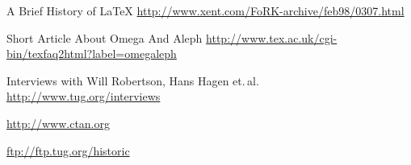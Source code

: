 \documentclass{scrartcl}
\begin{document}
\begin{thebibliography}{10}
	{A Brief History of \LaTeX}
	\newblock \url{http://www.xent.com/FoRK-archive/feb98/0307.html}
	
	{Short Article About Omega And Aleph}
	\newblock \url{http://www.tex.ac.uk/cgi-bin/texfaq2html?label=omegaleph}
	
	{Interviews with Will Robertson, Hans Hagen et.\,al.}
	\newblock \url{http://www.tug.org/interviews}
	
	\vspace{2ex}
	\vspace{1ex}
	
	\newblock \url{http://www.ctan.org}
	
	\newblock \url{ftp://ftp.tug.org/historic}
\end{thebibliography}

\label{sec:text}
\end{document}
